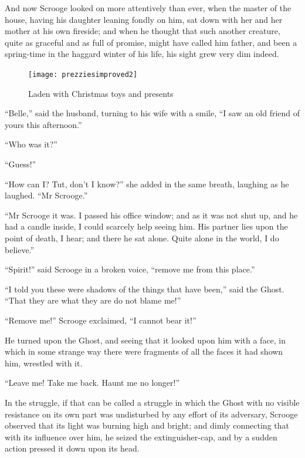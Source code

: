 \documentclass[paper=5.5in:8.5in,BCOR=7mm,twoside,DIV=calc,12pt,usegeometry]{scrbook} %
\begin{document}
And now Scrooge looked on more attentively than ever, when the master of the house, having his daughter leaning fondly on him, sat down with her and her mother at his own fireside; and when he thought that such another creature, quite as graceful and as full of promise, might have called him father, and been a spring-time in the haggard winter of his life, his sight grew very dim indeed.

\begin{figure}[p]
\begin{minipage}[c]{\linewidth}
\texttt{[image: prezziesimproved2]}
\caption[Laden with Christmas toys and presents]{Laden with Christmas toys and presents}
\end{minipage}
\end{figure}

\enquote{Belle,} said the husband, turning to his wife with a smile, \enquote{I saw an old friend of yours this afternoon.}

\enquote{Who was it?}

\enquote{Guess!}

\enquote{How can I? Tut, don't I know?} she added in the same breath, laughing as he laughed. \enquote{Mr Scrooge.}

\enquote{Mr Scrooge it was. I passed his office window; and as it was not shut up, and he had a candle inside, I could scarcely help seeing him. His partner lies upon the point of death, I hear; and there he sat alone. Quite alone in the world, I do believe.}

\enquote{Spirit!} said Scrooge in a broken voice, \enquote{remove me from this place.}

\enquote{I told you these were shadows of the things that have been,} said the Ghost. \enquote{That they are what they are do not blame me!}

\enquote{Remove me!} Scrooge exclaimed, \enquote{I cannot bear it!}

He turned upon the Ghost, and seeing that it looked upon him with a face, in which in some strange way there were fragments of all the faces it had shown him, wrestled with it.

\enquote{Leave me! Take me back. Haunt me no longer!}

In the struggle, if that can be called a struggle in which the Ghost with no visible resistance on its own part was undisturbed by any effort of its adversary, Scrooge observed that its light was burning high and bright; and dimly connecting that with its influence over him, he seized the extinguisher-cap, and by a sudden action pressed it down upon its head.
\end{document}
